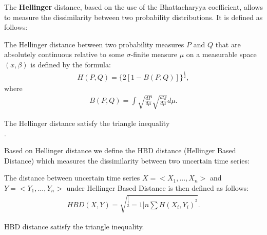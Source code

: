 The \textbf{Hellinger} distance, based on the use of the Bhattacharyya coefficient, allows to measure the dissimilarity between two probability distributions. It is defined as follows:

\begin{definition}
The Hellinger distance between two  probability measures  $P$ and $Q$ that are absolutely continuous relative to some $\sigma$-finite measure $\mu$ on a measurable space $(x,\beta)$ is defined
by the formula:
\begin{eqnarray}
H(P,Q)=\{2[1-B(P,Q)]\}^{\frac{1}{2}},
\end{eqnarray}
where
\begin{eqnarray}
B(P,Q)=\int\sqrt{\frac{dP}{d\mu}}\sqrt{\frac{dQ}{d\mu}}d\mu.
\end{eqnarray}
\end{definition}

\begin{theorem}
\label{hellinger}
The Hellinger distance satisfy the triangle inequality\\ \cite{ibragimov2013statistical}.
\end{theorem}

Based on Hellinger distance we define the HBD distance (Hellinger Based Distance) which measures the dissimilarity between two uncertain time series:

\begin{definition}
The distance between uncertain time series $X=<X_1, \ldots,X_n>$ and $Y=<Y_1, \ldots,Y_n>$ under
Hellinger Based Distance is then defined as follows:
\begin{eqnarray}
HBD(X,Y)=\sqrt{\stackrel[i=1]{n}{\sum}H(X_{i},Y_{i})^{^{2}}}.
\end{eqnarray} 
\end{definition}

\begin{theorem}
HBD distance satisfy the triangle inequality.
\end{theorem}

